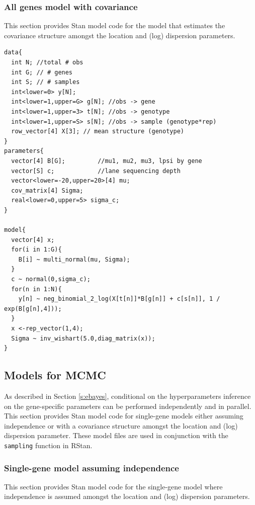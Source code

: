 \documentclass[useAMS,usenatbib,referee]{biom}
\begin{document}
\subsubsection{All genes model with covariance}
\label{s:all_genes_model_with_covariance}

This section provides Stan model code for the model that estimates the covariance structure amongst the location and (log) dispersion parameters. 

\begin{verbatim}
data{
  int N; //total # obs
  int G; // # genes
  int S; // # samples
  int<lower=0> y[N];
  int<lower=1,upper=G> g[N]; //obs -> gene
  int<lower=1,upper=3> t[N]; //obs -> genotype
  int<lower=1,upper=S> s[N]; //obs -> sample (genotype*rep)
  row_vector[4] X[3]; // mean structure (genotype)
}
parameters{
  vector[4] B[G];         //mu1, mu2, mu3, lpsi by gene
  vector[S] c;            //lane sequencing depth
  vector<lower=-20,upper=20>[4] mu;
  cov_matrix[4] Sigma;
  real<lower=0,upper=5> sigma_c;
}

model{
  vector[4] x;
  for(i in 1:G){
    B[i] ~ multi_normal(mu, Sigma);
  }
  c ~ normal(0,sigma_c);
  for(n in 1:N){
    y[n] ~ neg_binomial_2_log(X[t[n]]*B[g[n]] + c[s[n]], 1 / exp(B[g[n],4]));
  }
  x <-rep_vector(1,4);
  Sigma ~ inv_wishart(5.0,diag_matrix(x));
}
\end{verbatim}

\subsection{Models for MCMC}

As described in Section \ref{s:ebayes}, conditional on the hyperparameters inference on the gene-specific parameters can be performed independently and in parallel. This section provides Stan model code for single-gene models either assuming independence or with a covariance structure amongst the location and (log) dispersion parameter. These model files are used in conjunction with the {\tt sampling} function in RStan. 

\subsubsection{Single-gene model assuming independence}
\label{s:single_gene_model}

This section provides Stan model code for the single-gene model where independence is assumed amongst the location and (log) dispersion parameters.
\end{document}
